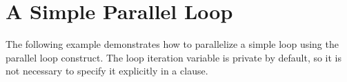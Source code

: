 \chapter{A Simple Parallel Loop}
\label{chap:ploop}

The following example demonstrates how to parallelize a simple loop using the parallel 
loop construct. The loop iteration variable is private by default, so it is not 
necessary to specify it explicitly in a  clause.



